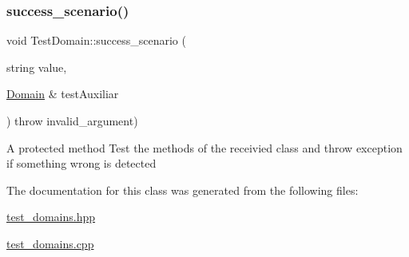 \subsubsection{\texorpdfstring{success\+\_\+scenario()}{success\_scenario()}}
{\footnotesize\ttfamily void Test\+Domain\+::success\+\_\+scenario (\begin{DoxyParamCaption}\item[{string}]{value,  }\item[{\hyperlink{class_domain}{Domain} \&}]{test\+Auxiliar }\end{DoxyParamCaption}) throw  invalid\+\_\+argument) \hspace{0.3cm}{\ttfamily [protected]}}

A protected method Test the methods of the receivied class and throw exception if something wrong is detected 

The documentation for this class was generated from the following files\+:\begin{DoxyCompactItemize}
\item 
\hyperlink{test__domains_8hpp}{test\+\_\+domains.\+hpp}\item 
\hyperlink{test__domains_8cpp}{test\+\_\+domains.\+cpp}\end{DoxyCompactItemize}
